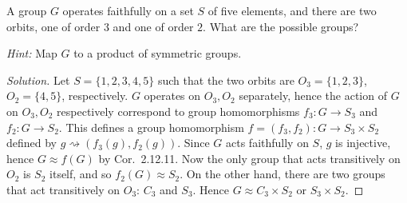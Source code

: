 \documentclass[12pt]{article}
\theoremstyle{remark}
\begin{document}
\setcounter{subsubsection}{4}
\begin{problem}
  A group $G$ operates faithfully on a set $S$ of five elements, and there are two orbits, one of order $3$ and one of order $2$. What are the possible groups?
  \par \noindent \emph{Hint:} Map $G$ to a product of symmetric groups.
\end{problem}
\begin{proof}[Solution]
  Let $S = \{1,2,3,4,5\}$ such that the two orbits are $O_3 = \{1,2,3\}$, $O_2 = \{4,5\}$, respectively. $G$ operates on $O_3,O_2$ separately, hence the action of $G$ on $O_3,O_2$ respectively correspond to group homomorphisms $f_3\colon G \to S_3$ and $f_2 \colon G \to S_2$. This defines a group homomorphism $f = (f_3,f_2) \colon G \to S_3 \times S_2$ defined by $g \rightsquigarrow (f_3(g),f_2(g))$. Since $G$ acts faithfully on $S$, $g$ is injective, hence $G \approx f(G)$ by Cor.~2.12.11. Now the only group that acts transitively on $O_2$ is $S_2$ itself, and so $f_2(G) \approx S_2$. On the other hand, there are two groups that act transitively on $O_3$: $C_3$ and $S_3$. Hence $G \approx C_3 \times S_2$ or $S_3 \times S_2$.
\end{proof}
\end{document}
